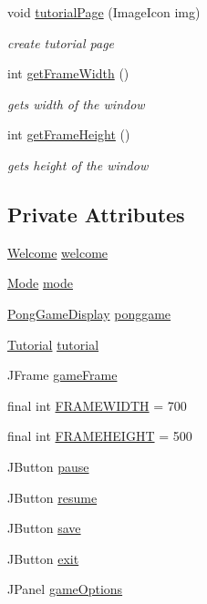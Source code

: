 \begin{DoxyCompactItemize}
void \hyperlink{classview_1_1_game_view_a67fd4999f1be51ce360b8bba68e87d9c}{tutorial\+Page} (Image\+Icon img)
\begin{DoxyCompactList}\small\item\em create tutorial page \end{DoxyCompactList}\item 
int \hyperlink{classview_1_1_game_view_a729fea181bb79a2767e11f8c7be01711}{get\+Frame\+Width} ()
\begin{DoxyCompactList}\small\item\em gets width of the window \end{DoxyCompactList}\item 
int \hyperlink{classview_1_1_game_view_a741912e646a65f33e3c571002ed0cf22}{get\+Frame\+Height} ()
\begin{DoxyCompactList}\small\item\em gets height of the window \end{DoxyCompactList}\end{DoxyCompactItemize}
\subsection*{Private Attributes}
\begin{DoxyCompactItemize}
\item 
\hyperlink{classview_1_1_welcome}{Welcome} \hyperlink{classview_1_1_game_view_a473510516d38bd1b016321b06962f0b0}{welcome}
\item 
\hyperlink{classview_1_1_mode}{Mode} \hyperlink{classview_1_1_game_view_a805dd6b76de78fe934f8c4287b4988ce}{mode}
\item 
\hyperlink{classview_1_1_pong_game_display}{Pong\+Game\+Display} \hyperlink{classview_1_1_game_view_a40ab8540fabeed491fc81dce3e801370}{ponggame}
\item 
\hyperlink{classview_1_1_tutorial}{Tutorial} \hyperlink{classview_1_1_game_view_a6bc586b3b4e3079253f50adb03864264}{tutorial}
\item 
J\+Frame \hyperlink{classview_1_1_game_view_a7e90e32a71e4cbc5356dd2960290917c}{game\+Frame}
\item 
final int \hyperlink{classview_1_1_game_view_a2ab92f79dc374ff6708c7798697b623a}{F\+R\+A\+M\+E\+W\+I\+D\+TH} = 700
\item 
final int \hyperlink{classview_1_1_game_view_a4883525ad5307e9ac642854eb6db66d1}{F\+R\+A\+M\+E\+H\+E\+I\+G\+HT} = 500
\item 
J\+Button \hyperlink{classview_1_1_game_view_aca05d6a7d46254d509c48b09945b7053}{pause}
\item 
J\+Button \hyperlink{classview_1_1_game_view_a51484e496307a01d4f261b3ab8517171}{resume}
\item 
J\+Button \hyperlink{classview_1_1_game_view_a0c0efd73b4ba0635f2d21d7980407cd0}{save}
\item 
J\+Button \hyperlink{classview_1_1_game_view_a3bf74babf6e5deb5f2c80a8d7b56ad77}{exit}
\item 
J\+Panel \hyperlink{classview_1_1_game_view_aba201c4e7e254be3254ddffba23f563e}{game\+Options}
\end{DoxyCompactItemize}


